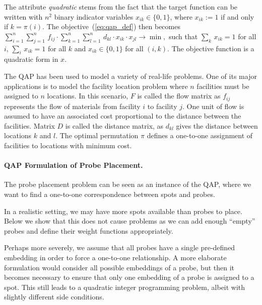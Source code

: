 \documentclass[english]{lni}
\newcommand{\ignore}[1]{}
\begin{document}
The attribute \emph{quadratic} stems from the fact that the target function
can be written with $n^2$ binary indicator variables $x_{ik}\in\{0,1\}$, where
$x_{ik}:=1$ if and only if $k=\pi(i)$. The objective~(\ref{eq:qap_def}) then
becomes
$
  \sum_{i=1}^{n} \sum_{j=1}^{n}\,  f_{ij} \cdot 
  \sum_{k=1}^{n} \sum_{l=1}^{n}\,  d_{kl} \cdot x_{ik}\cdot x_{jl}
  \to \min,
$
such that $\sum_{k}\, x_{ik}=1$ for all $i$, $\sum_{i}\, x_{ik}=1$ for all $k$
and $x_{ik}\in\{0,1\}$ for all $(i,k)$. The objective function is a quadratic
form in $x$.

The QAP has been used to model a variety of real-life problems. One of its
major applications is to model the facility location problem where $n$
facilities must be assigned to $n$ locations. In this scenario, $F$ is called
the flow matrix as $f_{ij}$ represents the flow of materials from facility $i$
to facility $j$. One unit of flow is assumed to have an associated cost
proportional to the distance between the facilities. Matrix $D$ is called the
distance matrix, as $d_{kl}$ gives the distance between locations $k$ and $l$.
The optimal permutation $\pi$ defines a one-to-one assignment of facilities to
locations with minimum cost.

\paragraph{QAP Formulation of Probe Placement.}
The probe placement problem can be seen as an instance of the QAP, where we
want to find a one-to-one correspondence between spots and probes.
\ignore{
To
formulate it, we use the facility location example by viewing the probes as
locations and the spots as facilities, i.e., the spots are assigned to the
probes. In this case the flow matrix $F$ contains the ``closeness'' values
between spots, and the distance matrix $D$ contains the (weighted) Hamming
distances between probe embeddings.  We first give the general formulation for
conflict index; the case of border length minimization is obtained by using
the particular weight functions given at the end of
Section~\ref{sec:model}.
}
In a realistic setting, we may have more spots available than probes
to place. Below we show that this does not cause problems as we can add enough
``empty'' probes and define their weight functions appropriately.

Perhaps more severely, we assume that all probes have a single pre-defined
embedding in order to force a one-to-one relationship.  A more elaborate
formulation would consider all possible embeddings of a probe, but then it
becomes necessary to ensure that only one embedding of a probe is assigned to
a spot. This still leads to a quadratic integer programming problem, albeit
with slightly different side conditions.
\end{document}
